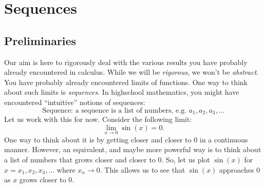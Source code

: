 \setlength{\chnumsep}{12em}
\chapter{Sequences}

\section{Preliminaries}

Our aim is here to rigorously deal with the various results you have probably already encountered
in calculus. While we will be \emph{rigorous}, we won't be \emph{abstract}. You have
probably already encountered limits of functions. One way to think about
such limits is \emph{sequences}. In highschool mathematics,
you might have encountered ``intuitive'' notions of sequences:
\[
\text{Sequence: }  \text{a sequence is a list of numbers, e.g. } a_1, a_2, a_3, \ldots
\]
Let us work with this for now. Consider the following limit:
\[
\lim_{x \to 0} \sin(x) = 0.
\]
One way to think about it is by getting closer and closer to $0$ in a continuous manner. However, an equivalent,
and maybe more powerful way is to think about a list of numbers that grows closer
and closer to $0$. So, let us plot $\sin(x)$ for $x = x_1, x_2, x_3, \ldots$ where
$x_n \to 0$. This allows us to see that $\sin(x)$ approaches $0$ as $x$ grows closer to $0$.

